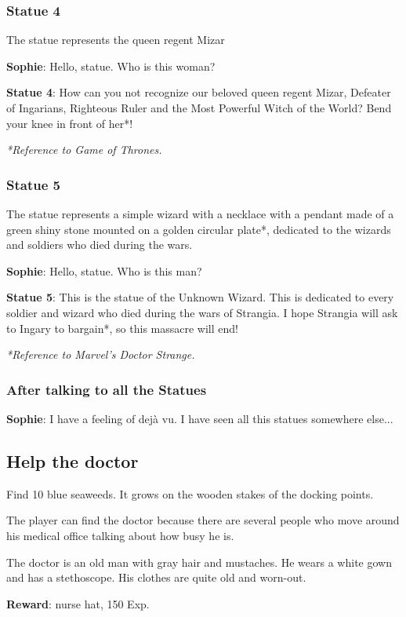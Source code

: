 \subsubsection*{Statue 4}
The statue represents the queen regent Mizar

\textbf{Sophie}: Hello, statue. Who is this woman?

\textbf{Statue 4}: How can you not recognize our beloved queen regent Mizar, Defeater of Ingarians, Righteous Ruler and the Most Powerful Witch of the World? Bend your knee in front of her*!

\textit{*Reference to Game of Thrones\texttrademark{}.}

\subsubsection*{Statue 5}
The statue represents a simple wizard with a necklace with a pendant made of a green shiny stone mounted on a golden circular plate*, dedicated to the wizards and soldiers who died during the wars.

\textbf{Sophie}: Hello, statue. Who is this man?

\textbf{Statue 5}: This is the statue of the Unknown Wizard. This is dedicated to every soldier and wizard who died during the wars of Strangia. I hope Strangia will ask to Ingary to bargain*, so this massacre will end!

\textit{*Reference to Marvel\texttrademark 's Doctor Strange.}

\subsubsection*{After talking to all the Statues}
\textbf{Sophie}: I have a feeling of dejà vu. I have seen all this statues somewhere else...


\subsection{Help the doctor}
Find 10 blue seaweeds. It grows on the wooden stakes of the docking points.

The player can find the doctor because there are several people who move around his medical office talking about how busy he is.

The doctor is an old man with gray hair and mustaches. He wears a white gown and has a stethoscope. His clothes are quite old and worn-out.

\textbf{Reward}: nurse hat, 150 Exp.

